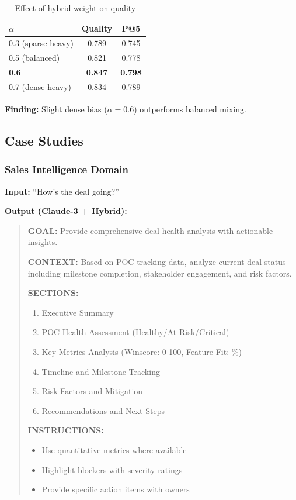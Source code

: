 \documentclass[11pt,a4paper]{article}
\begin{document}
\begin{table}[h]
\centering
\small
\begin{tabular}{lcc}
\toprule
\textbf{$\alpha$} & \textbf{Quality} & \textbf{P@5} \\
\midrule
0.3 (sparse-heavy) & 0.789 & 0.745 \\
0.5 (balanced) & 0.821 & 0.778 \\
\textbf{0.6} & \textbf{0.847} & \textbf{0.798} \\
0.7 (dense-heavy) & 0.834 & 0.789 \\
\bottomrule
\end{tabular}
\caption{Effect of hybrid weight on quality}
\label{tab:alpha_ablation}
\end{table}

\textbf{Finding:} Slight dense bias ($\alpha = 0.6$) outperforms balanced mixing.

\subsection{Case Studies}

\subsubsection{Sales Intelligence Domain}

\textbf{Input:} ``How's the deal going?''

\textbf{Output (Claude-3 + Hybrid):}
\begin{quote}
\textbf{GOAL:} Provide comprehensive deal health analysis with actionable insights.

\textbf{CONTEXT:} Based on POC tracking data, analyze current deal status including milestone completion, stakeholder engagement, and risk factors.

\textbf{SECTIONS:}
\begin{enumerate}
    \item Executive Summary
    \item POC Health Assessment (Healthy/At Risk/Critical)
    \item Key Metrics Analysis (Winscore: 0-100, Feature Fit: \%)
    \item Timeline and Milestone Tracking
    \item Risk Factors and Mitigation
    \item Recommendations and Next Steps
\end{enumerate}

\textbf{INSTRUCTIONS:}
\begin{itemize}
    \item Use quantitative metrics where available
    \item Highlight blockers with severity ratings
    \item Provide specific action items with owners
\end{itemize}
\end{quote}
\end{document}

